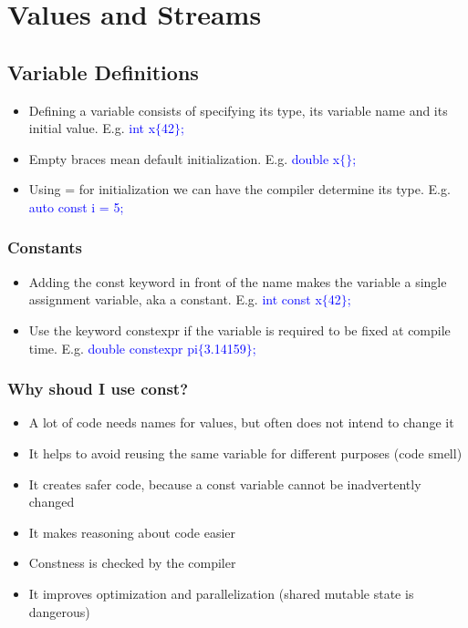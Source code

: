 
\section{Values and Streams}

\subsection{Variable Definitions}
\begin{itemize}
    \item Defining a variable consists of specifying its type, its variable name and its initial value. E.g. \textcolor{blue}{int x$\{$42$\}$;}
    \item Empty braces mean default initialization. E.g. \textcolor{blue}{double x$\{$$\}$;}
    \item Using = for initialization we can have the compiler determine its type. E.g. \textcolor{blue}{auto const i = 5;}
\end{itemize}

\subsubsection{Constants}
\begin{itemize}
    \item Adding the const keyword in front of the name makes the variable a single assignment variable, aka a constant. E.g. \textcolor{blue}{int const x$\{$42$\}$;}
    \item Use the keyword constexpr if the variable is required to be fixed at compile time. E.g. \textcolor{blue}{double constexpr pi$\{$3.14159$\}$;}
\end{itemize}

\subsubsection{Why shoud I use const?}
\begin{itemize}
    \item A lot of code needs names for values, but often does not intend to change it
    \item It helps to avoid reusing the same variable for different purposes (code smell)
    \item It creates safer code, because a const variable cannot be inadvertently changed
    \item It makes reasoning about code easier
    \item Constness is checked by the compiler
    \item It improves optimization and parallelization (shared mutable state is dangerous)
\end{itemize}

